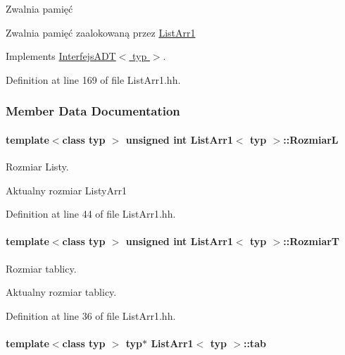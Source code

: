 Zwalnia pamięć 

Zwalnia pamięć zaalokowaną przez \hyperlink{class_list_arr1}{List\-Arr1} 

Implements \hyperlink{class_interfejs_a_d_t_a75427479b00e3d4a0c5f9615216262ea}{Interfejs\-A\-D\-T$<$ typ $>$}.



Definition at line 169 of file List\-Arr1.\-hh.



\subsubsection{Member Data Documentation}
\hypertarget{class_list_arr1_a08eada9ef97462cfa3906c5c8c1bc851}{
\paragraph[{Rozmiar\-L}]{\setlength{\rightskip}{0pt plus 5cm}template$<$class typ $>$ unsigned int {\bf List\-Arr1}$<$ typ $>$\-::Rozmiar\-L\hspace{0.3cm}{\ttfamily [private]}}}\label{class_list_arr1_a08eada9ef97462cfa3906c5c8c1bc851}


Rozmiar Listy. 

Aktualny rozmiar Listy\-Arr1 

Definition at line 44 of file List\-Arr1.\-hh.

\hypertarget{class_list_arr1_a1f1091116cd72de9affe8d4bcb1998a5}{
\paragraph[{Rozmiar\-T}]{\setlength{\rightskip}{0pt plus 5cm}template$<$class typ $>$ unsigned int {\bf List\-Arr1}$<$ typ $>$\-::Rozmiar\-T\hspace{0.3cm}{\ttfamily [private]}}}\label{class_list_arr1_a1f1091116cd72de9affe8d4bcb1998a5}


Rozmiar tablicy. 

Aktualny rozmiar tablicy. 

Definition at line 36 of file List\-Arr1.\-hh.

\hypertarget{class_list_arr1_ad411362d4d7884f0bbf5e081de7f2c6b}{
\paragraph[{tab}]{\setlength{\rightskip}{0pt plus 5cm}template$<$class typ $>$ typ$\ast$ {\bf List\-Arr1}$<$ typ $>$\-::tab\hspace{0.3cm}{\ttfamily [private]}}}\label{class_list_arr1_ad411362d4d7884f0bbf5e081de7f2c6b}


